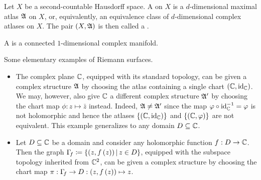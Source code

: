 \documentclass[../Moduli_Spaces_of_Riemann_Surfaces.tex]{subfiles}
\begin{document}
    \begin{definition}
        Let $X$ be a second-countable Hausdorff space. A   on $X$ is a $d$-dimensional maximal atlas $\mathfrak{A}$ on $X$, or, equivalently, an equivalence class of $d$-dimensional complex atlases on $X$. The pair $\left(X,\mathfrak{A}\right)$ is then called a  .
    \end{definition}
    \begin{definition}
        A  is a connected $1$-dimensional complex manifold.
    \end{definition}
    \begin{example}
        Some elementary examples of Riemann surfaces.
        \begin{itemize}
            \item The complex plane $\mathbb{C}$, equipped with its standard topology, can be given a complex structure $\mathfrak{A}$ by choosing the atlas containing a single chart $\left(\mathbb{C},\operatorname{id}_{\mathbb{C}}\right)$. We may, however, also give $\mathbb{C}$ a different complex structure $\mathfrak{A}'$ by choosing the chart map $\phi:z\mapsto\bar{z}$ instead. Indeed, $\mathfrak{A}\neq\mathfrak{A}'$ since the map $\varphi\circ\operatorname{id}_{\mathbb{C}}^{-1}=\varphi$ is not holomorphic and hence the atlases $\left\{\left(\mathbb{C},\operatorname{id}_{\mathbb{C}}\right)\right\}$ and $\left\{\left(\mathbb{C},\varphi\right)\right\}$ are not equivalent. This example generalizes to any domain $D\subseteq\mathbb{C}$.
            \item Let $D\subseteq\mathbb{C}$ be a domain and consider any holomorphic function $f:D\to\mathbb{C}$. Then the graph $\Gamma\!_f\coloneqq\left\{\left(z,f\left(z\right)\right)\,\middle\vert\, z\in D\right\}$, equipped with the subspace topology inherited from $\mathbb{C}^2$, can be given a complex structure by choosing the chart map $\pi:\Gamma\!_f\to D:\left(z,f\left(z\right)\right)\mapsto z$.\exqed
        \end{itemize}
    \end{example}
\end{document}
